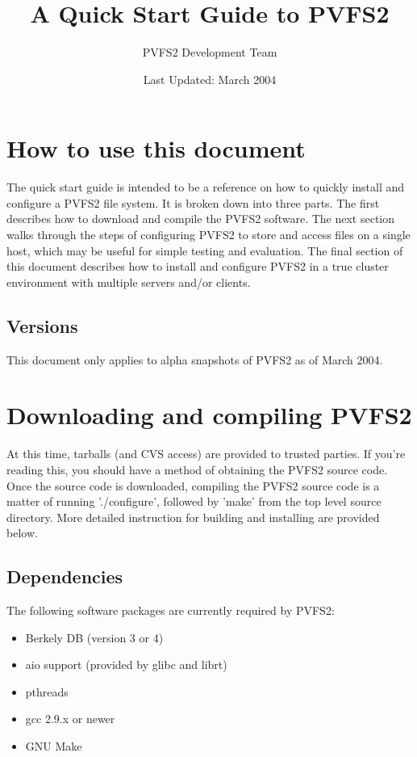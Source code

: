 \documentclass[11pt, letterpaper]{article}
\title{A Quick Start Guide to PVFS2}
\author{ PVFS2 Development Team }
\date{Last Updated: March 2004}
\begin{document}
\maketitle

\tableofcontents

\newpage

\thispagestyle{empty}

\section{How to use this document}
\label{sec:howto}

The quick start guide is intended to be a reference on how to quickly
install and configure a PVFS2 file system.  It is broken down into
three parts.  The first describes how to download and compile the
PVFS2 software.  The next section walks through the steps of
configuring PVFS2 to store and access files on a single host, which
may be useful for simple testing and evaluation.  The final section of
this document describes how to install and configure PVFS2 in a true
cluster environment with multiple servers and/or clients.

\subsection{Versions}

This document only applies to alpha snapshots of PVFS2 as of March
2004.

\section{Downloading and compiling PVFS2}

At this time, tarballs (and CVS access) are provided to trusted
parties.  If you're reading this, you should have a method of
obtaining the PVFS2 source code.  Once the source code is downloaded,
compiling the PVFS2 source code is a matter of running './configure',
followed by 'make' from the top level source directory.  More detailed
instruction for building and installing are provided below.

\subsection{Dependencies}

The following software packages are currently required by PVFS2:
\begin{itemize}
\item Berkely DB (version 3 or 4)
\item aio support (provided by glibc and librt)
\item pthreads
\item gcc 2.9.x or newer
\item GNU Make
\end{itemize}
\end{document}
